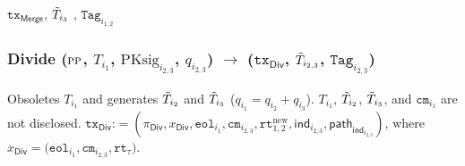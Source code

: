 \begin{algorithm}
\begin{algorithmic}[1]
\State \Return $\texttt{tx}_{\textsf{Merge}}$, $\Tilde{T}_{i_3}$ , $\texttt{Tag}_{i_{1,2}}$
\end{algorithmic}
\end{algorithm}

\newpage

\subsubsection{\textsf{Divide} ($\textsc{pp}$, $T_{i_1}$,  $\text{PKsig}_{i_{2,3}}$, $q_{i_{2,3}}$) $\rightarrow$ ($\texttt{tx}_{\textsf{Div}}$, $\Tilde{T}_{i_{2,3}}$, $\texttt{Tag}_{i_{2,3}}$)}

Obsoletes $T_{i_1}$ and generates $\Tilde{T}_{i_2}$ and $\Tilde{T}_{i_3}$ ($q_{i_1} = q_{i_2} + q_{i_3}$). $T_{i_1}$, $\Tilde{T}_{i_2}$, $\Tilde{T}_{i_3}$, and  $\texttt{cm}_{i_1}$ are not disclosed. $\texttt{tx}_\mathsf{Div} $:$=(\pi_{\mathsf{Div}}, x_\mathsf{Div}, \texttt{eol}_{i_{1}},  \texttt{cm}_{i_{2,3}}, \texttt{rt}_{1,2}^{\text{new}},\mathsf{ind}_{i_{2,3}}, \mathsf{path}_{\mathsf{ind}_{i_{2,3}}} )$, where $x_\mathsf{Div} =\big(\texttt{eol}_{i_1}, \texttt{cm}_{i_{2,3}}, \texttt{rt}_\tau \big)$.


